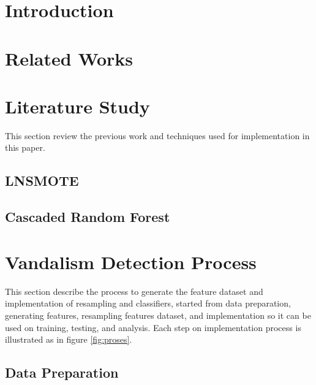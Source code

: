 







\section{Introduction}
\label{section:introduction}
	


\section{Related Works}
	


\section{Literature Study}
	\label{section:literature_study}

This section review the previous work and techniques used for implementation in
this paper.

\subsection{LNSMOTE}
	\label{subsection:lnsmote}
	

\subsection{Cascaded Random Forest}
	\label{subsection:crf}
	


\section{Vandalism Detection Process}
	\label{section:research_methodology}

This section describe the process to generate the feature dataset and
implementation of resampling and classifiers, started from data preparation,
generating features, resampling features dataset, and implementation so it can
be used on training, testing, and analysis.
Each step on implementation process is illustrated as in figure
\ref{fig:proses}.



\subsection{Data Preparation}
	\label{subsection:data_preparation}
	

